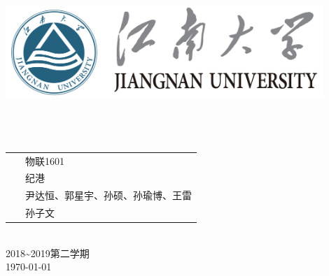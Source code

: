 \documentclass[a4paper]{ctexart}
\begin{document}
\begin{titlepage}
	\begin{center}
    \includegraphics[width=0.9\textwidth]{figure//Njust.png}\\
    \vspace{10mm}
    \textbf{}\\[0.8cm]
    \textbf{}\\[3cm]
    \textbf{}\\[3cm]
	\vspace{\fill}
	\setlength{\extrarowheight}{3mm}
	{\songti{}	
		\begin{tabular}{rl}
			{\makebox[4\ccwd][s]{班\qquad 级：}}& ~\kaishu 物联1601\\
			{\makebox[4\ccwd][s]{组\qquad 长：}}& ~\kaishu 纪港 \\
			{\makebox[4\ccwd][s]{组\qquad 员：}}& ~\kaishu 尹达恒、郭星宇、孙硕、孙瑜博、王雷 \\
			{\makebox[4\ccwd][s]{指导老师：}} & ~\kaishu 孙子文\\
		\end{tabular}
	}\\[2cm]
	\vspace{\fill}
	2018\textasciitilde 2019第二学期\\
	\today
	\end{center}	
\end{titlepage}
\end{document}

